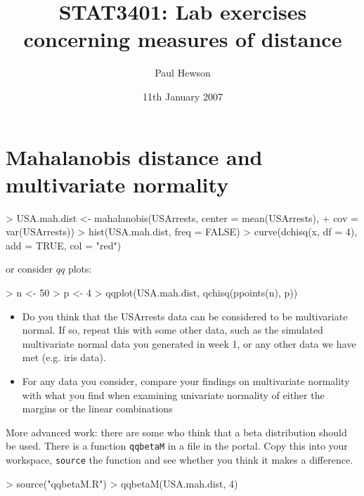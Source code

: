 \documentclass[11pt]{article}
\title{STAT3401: Lab exercises concerning measures of distance}
\author{Paul Hewson}
\date{11th January 2007}
\begin{document}
\setlength{\parindent}{0pt}
\setlength{\parskip}{12pt}
\sffamily
\maketitle


\section{Mahalanobis distance and multivariate normality}

\begin{Schunk}
\begin{Sinput}
> USA.mah.dist <- mahalanobis(USArrests, center = mean(USArrests), 
+     cov = var(USArrests))
> hist(USA.mah.dist, freq = FALSE)
> curve(dchisq(x, df = 4), add = TRUE, col = "red")
\end{Sinput}
\end{Schunk}

or consider $qq$ plots:

\begin{Schunk}
\begin{Sinput}
> n <- 50
> p <- 4
> qqplot(USA.mah.dist, qchisq(ppoints(n), p))
\end{Sinput}
\end{Schunk}


\begin{itemize}
\item Do you think that the USArrests data can be considered to be multivariate normal.   If so, repeat this with some other data, such as the simulated multivariate normal data you generated in week 1, or any other data we have met (e.g. iris data).
\item For any data you consider, compare your findings on multivariate normality with what you find when examining univariate normality of either the margins or the linear combinations
\end{itemize}

More advanced work: there are some who think that a beta distribution should be used.   There is a function \texttt{qqbetaM} in a file in the portal.   Copy this into your workspace, \texttt{source} the function and see whether you think it makes a difference.     

\begin{Schunk}
\begin{Sinput}
> source("qqbetaM.R")
> qqbetaM(USA.mah.dist, 4)
\end{Sinput}
\end{Schunk}
\end{document}
